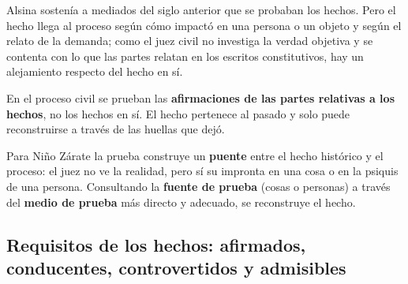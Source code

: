 \documentclass[12pt,oneside]{book}
\begin{document}
Alsina sostenía a mediados del siglo anterior que se probaban los hechos. Pero el hecho llega al proceso según cómo impactó en una persona o un objeto y según el relato de la demanda; como el juez civil no investiga la verdad objetiva y se contenta con lo que las partes relatan en los escritos constitutivos, hay un alejamiento respecto del hecho en sí.

\begin{importante}
En el proceso civil se prueban las \textbf{afirmaciones de las partes relativas a los hechos}, no los hechos en sí. El hecho pertenece al pasado y solo puede reconstruirse a través de las huellas que dejó.
\end{importante}

Para Niño Zárate la prueba construye un \textbf{puente} entre el hecho histórico y el proceso: el juez no ve la realidad, pero sí su impronta en una cosa o en la psiquis de una persona. Consultando la \textbf{fuente de prueba} (cosas o personas) a través del \textbf{medio de prueba} más directo y adecuado, se reconstruye el hecho.

\subsection{Requisitos de los hechos: afirmados, conducentes, controvertidos y admisibles}
\end{document}
